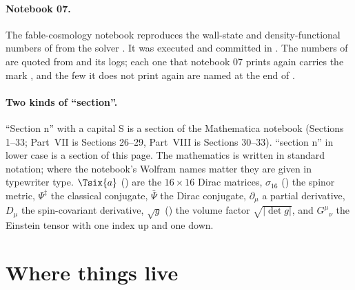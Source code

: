 \paragraph{Notebook 07.} The fable-cosmology notebook  reproduces the
wall-state and density-functional numbers of  from the solver
. It was executed and committed in . The
numbers of  are quoted from  and its logs; each one that
notebook 07 prints again carries the mark , and the few it does not print again are
named at the end of .

\paragraph{Two kinds of ``section''.} ``Section n'' with a capital S is a section of the Mathematica
notebook (Sections 1--33; Part~VII is Sections 26--29, Part~VIII is Sections 30--33). ``section n'' in
lower case is a section of this page. The mathematics is written in standard notation; where the
notebook's Wolfram names matter they are given in typewriter type. $\Tsix{a}$ () are the
$16\times16$ Dirac matrices, $\sigma_{16}$ () the spinor metric, $\Psi^{\ddagger}$ the
classical conjugate, $\bar\Psi$ the Dirac conjugate, $\partial_\mu$ a partial derivative, $D_\mu$ the
spin-covariant derivative, $\sqrt g$ () the volume factor $\sqrt{|\det g|}$, and
$G^\mu{}_\nu$ the Einstein tensor with one index up and one down.

\tableofcontents

\section*{Where things live}
\label{sec:where}

